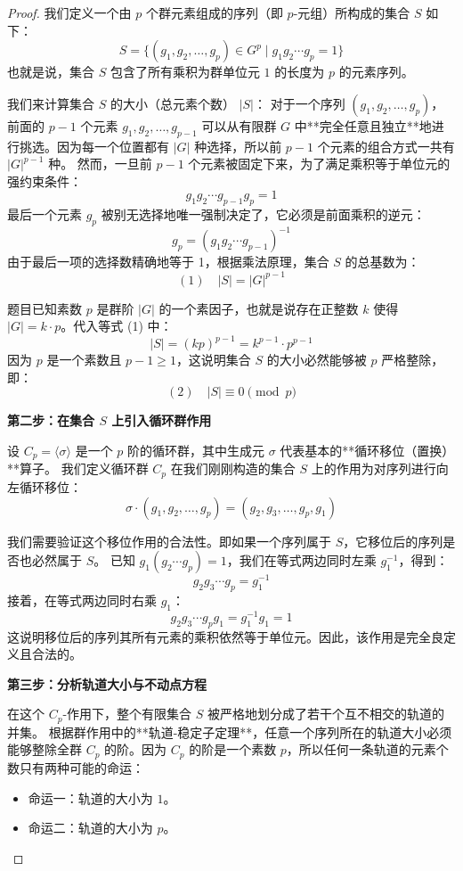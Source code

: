 \documentclass[]{article}
\begin{document}
\begin{proof}
我们定义一个由 $p$ 个群元素组成的序列（即 $p$-元组）所构成的集合 $S$ 如下：
\[ S = \{ (g_1, g_2, \dots, g_p) \in G^p \mid g_1 g_2 \cdots g_p = 1 \} \]
也就是说，集合 $S$ 包含了所有乘积为群单位元 $1$ 的长度为 $p$ 的元素序列。

我们来计算集合 $S$ 的大小（总元素个数） $|S|$：
对于一个序列 $(g_1, g_2, \dots, g_p)$，前面的 $p-1$ 个元素 $g_1, g_2, \dots, g_{p-1}$ 可以从有限群 $G$ 中**完全任意且独立**地进行挑选。因为每一个位置都有 $|G|$ 种选择，所以前 $p-1$ 个元素的组合方式一共有 $|G|^{p-1}$ 种。
然而，一旦前 $p-1$ 个元素被固定下来，为了满足乘积等于单位元的强约束条件：
\[ g_1 g_2 \cdots g_{p-1} g_p = 1 \]
最后一个元素 $g_p$ 被别无选择地唯一强制决定了，它必须是前面乘积的逆元：
\[ g_p = (g_1 g_2 \cdots g_{p-1})^{-1} \]
由于最后一项的选择数精确地等于 1，根据乘法原理，集合 $S$ 的总基数为：
\[ (1) \quad |S| = |G|^{p-1} \]

题目已知素数 $p$ 是群阶 $|G|$ 的一个素因子，也就是说存在正整数 $k$ 使得 $|G| = k \cdot p$。代入等式 (1) 中：
\[ |S| = (kp)^{p-1} = k^{p-1} \cdot p^{p-1} \]
因为 $p$ 是一个素数且 $p-1 \ge 1$，这说明集合 $S$ 的大小必然能够被 $p$ 严格整除，即：
\[ (2) \quad |S| \equiv 0 \pmod p \]

\bigskip
\noindent \textbf{第二步：在集合 $S$ 上引入循环群作用}

设 $C_p = \langle \sigma \rangle$ 是一个 $p$ 阶的循环群，其中生成元 $\sigma$ 代表基本的**循环移位（置换）**算子。
我们定义循环群 $C_p$ 在我们刚刚构造的集合 $S$ 上的作用为对序列进行向左循环移位：
\[ \sigma \cdot (g_1, g_2, \dots, g_p) = (g_2, g_3, \dots, g_p, g_1) \]

我们需要验证这个移位作用的合法性。即如果一个序列属于 $S$，它移位后的序列是否也必然属于 $S$。
已知 $g_1 (g_2 \cdots g_p) = 1$，我们在等式两边同时左乘 $g_1^{-1}$，得到：
\[ g_2 g_3 \cdots g_p = g_1^{-1} \]
接着，在等式两边同时右乘 $g_1$：
\[ g_2 g_3 \cdots g_p g_1 = g_1^{-1} g_1 = 1 \]
这说明移位后的序列其所有元素的乘积依然等于单位元。因此，该作用是完全良定义且合法的。

\bigskip
\noindent \textbf{第三步：分析轨道大小与不动点方程}

在这个 $C_p$-作用下，整个有限集合 $S$ 被严格地划分成了若干个互不相交的轨道的并集。
根据群作用中的**轨道-稳定子定理**，任意一个序列所在的轨道大小必须能够整除全群 $C_p$ 的阶。因为 $C_p$ 的阶是一个素数 $p$，所以任何一条轨道的元素个数只有两种可能的命运：
\begin{itemize}
	\item 命运一：轨道的大小为 $1$。
	\item 命运二：轨道的大小为 $p$。
\end{itemize}


\end{proof}
\end{document}
